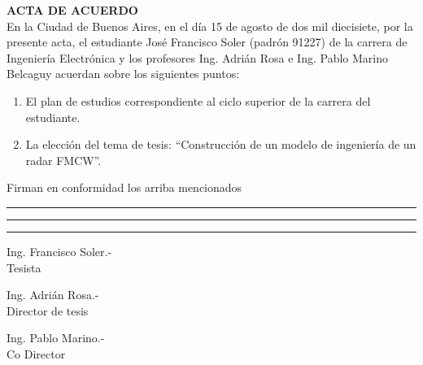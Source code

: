 \hspace*{\fill}\textbf{ACTA DE ACUERDO}\hspace*{\fill}
\\

En la Ciudad de Buenos Aires, en el día 15 de agosto de dos mil diecisiete, por la presente acta, el estudiante José Francisco Soler (padrón 91227) de la carrera de Ingeniería Electrónica y los profesores Ing. Adrián Rosa e Ing. Pablo Marino Belcaguy acuerdan sobre los siguientes puntos:

\begin{enumerate}
    \item El plan de estudios correspondiente al ciclo superior de la carrera del estudiante.
    \item La elección del tema de tesis: “Construcción de un modelo de ingeniería de un radar FMCW”.
\end{enumerate}


Firman en conformidad los arriba mencionados

\vspace*{3cm}
\noindent\rule{4cm}{0.4pt}\hfill\rule{4cm}{0.4pt}\hfill\rule{4cm}{0.4pt}

\noindent\parbox{4cm}{Ing. Francisco Soler.-\\Tesista} \hfill \parbox{4cm}{Ing. Adrián Rosa.-\\Director de tesis} \hfill
\parbox{4cm}{Ing. Pablo Marino.-\\Co Director}